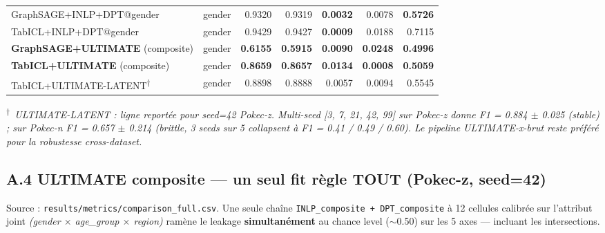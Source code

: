 \documentclass[10pt,a4paper]{article}
\begin{document}
\begin{center}
\begin{tabular}{l l r r r r r}
GraphSAGE+INLP+DPT@gender & gender & 0.9320 & 0.9319 & \textbf{0.0032} & 0.0078 & \textbf{0.5726} \\
TabICL+INLP+DPT@gender & gender & 0.9429 & 0.9427 & \textbf{0.0009} & 0.0188 & 0.7115 \\
\textbf{GraphSAGE+ULTIMATE} (composite) & gender & \textbf{0.6155} & \textbf{0.5915} & \textbf{0.0090} & \textbf{0.0248} & \textbf{0.4996} \\
\textbf{TabICL+ULTIMATE} (composite) & gender & \textbf{0.8659} & \textbf{0.8657} & \textbf{0.0134} & \textbf{0.0008} & \textbf{0.5059} \\
TabICL+ULTIMATE-LATENT\textsuperscript{$\dagger$} & gender & 0.8898 & 0.8888 & 0.0057 & 0.0094 & 0.5545 \\
\bottomrule
\end{tabular}
\end{center}

\noindent\footnotesize\textit{\textsuperscript{$\dagger$}~ULTIMATE-LATENT :
ligne reportée pour seed=42 Pokec-z. Multi-seed [3, 7, 21, 42, 99] sur
Pokec-z donne F1 = 0.884 $\pm$ 0.025 (stable) ; sur Pokec-n F1 =
0.657 $\pm$ 0.214 (brittle, 3 seeds sur 5 collapsent à F1 =
0.41 / 0.49 / 0.60). Le pipeline ULTIMATE-x-brut reste préféré pour la
robustesse cross-dataset.}\normalsize

\subsection*{A.4 ULTIMATE composite — un seul fit règle TOUT (Pokec-z, seed=42)}

Source : \texttt{results/metrics/comparison\_full.csv}. Une seule chaîne
\texttt{INLP\_composite + DPT\_composite} à 12 cellules calibrée sur
l'attribut joint \emph{(gender $\times$ age\_group $\times$ region)}
ramène le leakage \textbf{simultanément} au chance level ($\sim$0.50)
sur les 5 axes — incluant les intersections.
\end{document}
